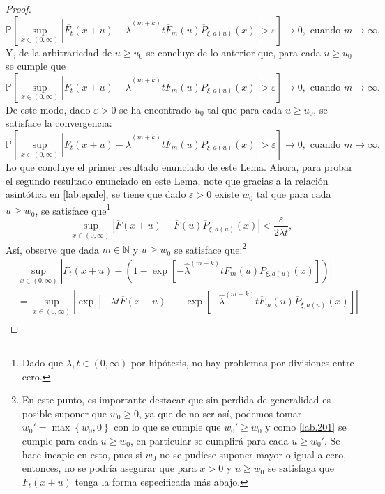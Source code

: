 \documentclass[10.5pt,notitlepage]{article}
\newcommand{\PP}{\mathbb{P}}
\newcommand{\ee}{\varepsilon}
\newcommand{\NN}{\mathbb{N}}
\newcommand{\abs}[1]{\left\lvert #1 \right\rvert}
\newcommand{\corch}[1]{\left[ #1 \right]}
\newcommand{\kis}[1]{\left\{ #1 \right\}}
\newcommand{\pare}[1]{\left( #1 \right)}
\theoremstyle{plain}
\begin{document}
\begin{proof}
  \[
 \PP\corch{ \sup_{x \in (0, \infty)}\abs{\overline{F_t}(x + u) -  \hat{\lambda}^{(m+k)} t \overline{F}_{m}(u)\overline{P}_{\xi,a(u)}(x)}  > \ee} \to 0, \text{ cuando } m \to \infty.
 \]
 Y, de la arbitrariedad de \(u \geq u_0\) se concluye de lo anterior que, para cada \(u \geq u_0\) se cumple que 
  \[
 \PP\corch{ \sup_{x \in (0, \infty)}\abs{\overline{F_t}(x + u) -  \hat{\lambda}^{(m + k)} t \overline{F}_{m}(u)\overline{P}_{\xi,a(u)}(x)}  > \ee} \to 0, \text{ cuando } m \to \infty.
 \]
 De este modo, dado \(\ee > 0\) se ha encontrado \(u_0\) tal que para cada \(u \geq u_0\), se satisface la convergencia:
\begin{equation}\label{lab.1111}
 \PP\corch{ \sup_{x \in (0, \infty)}\abs{\overline{F_t}(x + u) -  \hat{\lambda}^{(m+k)} t \overline{F}_{m}(u)\overline{P}_{\xi,a(u)}(x)}  > \ee} \to 0, \text{ cuando } m \to \infty.    
\end{equation}
Lo que concluye el primer resultado enunciado de este Lema. Ahora, para probar el segundo resultado enunciado en este Lema, note que gracias a la relación asintótica en \eqref{lab.epale}, se tiene que dado \(\ee >0\) existe \(w_0\) tal que para cada \(u \geq w_0\), se satisface que\footnote{Dado que \(\lambda,t\in(0,\infty)\) por hipótesis, no hay problemas por divisiones entre cero.}
\begin{equation}\label{lab.201}
    \sup_{x \in (0, \infty)}\abs{\overline{F}(x + u) - \overline{F}(u)\overline{P}_{\xi,a(u)}(x)} < \frac{\ee}{2 \lambda t },
\end{equation}
Así, observe que dada \(m \in \NN\) y \(u \geq w_0\) se satisface que:\footnote{En este punto, es importante destacar que sin perdida de generalidad es posible suponer que \(w_0\geq 0\), ya que de no ser así, podemos tomar \(w_0' =\max\kis{w_0,0}\) con lo que se cumple que \(w_0' \geq w_0\) y como \eqref{lab.201} se cumple para cada \(u\geq w_0\), en particular se cumplirá para cada \(u \geq w_0'\). Se hace incapie en esto, pues si \(w_0\) no se pudiese suponer mayor o igual a cero, entonces, no se podría asegurar que para \(x >0\) y \(u\geq w_0\) se satisfaga que \(F_{t}(x + u)\) tenga la forma especificada más abajo. }
{\tiny
\begin{align*}
     &\sup_{x \in (0, \infty)}\abs{\overline{F_t}(x + u) -  \pare{1 - \exp\corch{- \hat{\lambda}^{(m+k)} t \overline{F}_{m}(u)\overline{P}_{\xi,a(u)}(x)}}} \\
     &= \sup_{x \in (0, \infty)}\abs{\exp\corch{- \lambda t \overline{F}(x+u)} -  \exp\corch{- \hat{\lambda}^{(m+k)} t \overline{F}_{m}(u)\overline{P}_{\xi,a(u)}(x)}} \\ 

\end{align*}}
\end{proof}
\end{document}
